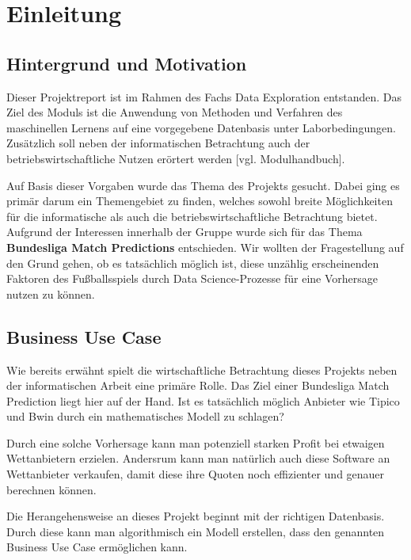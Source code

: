 \chapter{Einleitung}

\section{Hintergrund und Motivation}
Dieser Projektreport ist im Rahmen des Fachs Data Exploration entstanden. Das Ziel des Moduls ist die \glqq Anwendung von Methoden und Verfahren des maschinellen Lernens auf eine vorgegebene Datenbasis unter Laborbedingungen\grqq [Modulhandbuch]. Zusätzlich soll neben der informatischen Betrachtung auch der betriebswirtschaftliche Nutzen erörtert werden [vgl. Modulhandbuch].

Auf Basis dieser Vorgaben wurde das Thema des Projekts gesucht. Dabei ging es primär darum ein Themengebiet zu finden, welches sowohl breite Möglichkeiten für die informatische als auch die betriebswirtschaftliche Betrachtung bietet. Aufgrund der Interessen innerhalb der Gruppe wurde sich für das Thema \textbf{Bundesliga Match Predictions} entschieden. Wir wollten der Fragestellung auf den Grund gehen, ob es tatsächlich möglich ist, diese unzählig erscheinenden Faktoren des Fußballsspiels durch Data Science-Prozesse für eine Vorhersage nutzen zu können.

\section{Business Use Case}
Wie bereits erwähnt spielt die wirtschaftliche Betrachtung dieses Projekts neben der informatischen Arbeit eine primäre Rolle. Das Ziel einer Bundesliga Match Prediction liegt hier auf der Hand. Ist es tatsächlich möglich Anbieter wie Tipico und Bwin durch ein mathematisches Modell zu schlagen?

Durch eine solche Vorhersage kann man potenziell starken Profit bei etwaigen Wettanbietern erzielen. Andersrum kann man natürlich auch diese Software an Wettanbieter verkaufen, damit diese ihre Quoten noch effizienter und genauer berechnen können. 

Die Herangehensweise an dieses Projekt beginnt mit der richtigen Datenbasis. Durch diese kann man algorithmisch ein Modell erstellen, dass den genannten Business Use Case ermöglichen kann.